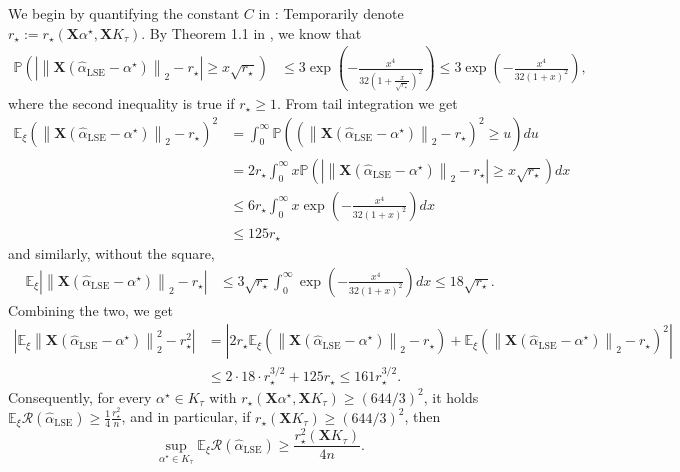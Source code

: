 \documentclass[a4paper]{article}
\newcommand{\pr}[1]{\left(#1\right)}
\newcommand{\abs}[1]{\left\lvert#1\right\rvert}
\newcommand{\norm}[1]{\left\|#1\right\|}
\newcommand{\X}[0]{\mathbf{X}}
\newcommand{\EE}[0]{\mathbb{E}}
\newcommand{\PP}[0]{\mathbb{P}}
\newcommand{\cR}[0]{\mathcal{R}}
\newcommand{\ha}[0]{\widehat{\alpha}}
\newcommand{\alphastar}{\alpha^\star}
\DeclareMathOperator{\LSEOp}{LSE}
\newcommand{\haLSE}[0]{\ha_{{\LSEOp}}}
\newcommand{\Kt}[0]{K_\tau}
\newcommand{\rstar}[0]{r_\star}
\theoremstyle{thmstyle}
\theoremstyle{defstyle}
\theoremstyle{remark}
\begin{document}
We begin by quantifying the constant $C$ in \cite[Corollary 1.2]{Chatterjee2014}: Temporarily denote $\rstar:=\rstar(\X\alphastar,\X \Kt)$.
By Theorem 1.1 in \cite{Chatterjee2014}, we know that
\begin{align*}
    \PP\pr{\abs{\norm{\X\pr{\haLSE-\alphastar}}_2-\rstar}\geq x\sqrt{\rstar}}&\leq 3\exp\pr{-\frac{x^4}{32(1+\frac{x}{\sqrt{\rstar}})^2}} \leq 3\exp\pr{-\frac{x^4}{32(1+x)^2}},
\end{align*}
where the second inequality is true if $\rstar\geq 1$.
From tail integration we get
\begin{align*}
    \EE_\xi\pr{\norm{\X(\haLSE-\alphastar)}_2-\rstar}^2 &= \int_0^\infty \PP\pr{\pr{\norm{\X(\haLSE-\alphastar)}_2-\rstar}^2\geq u}du \\
    &= 2\rstar \int_0^\infty x\PP\pr{\abs{\norm{\X\pr{\haLSE-\alphastar}}_2-\rstar}\geq x\sqrt{\rstar}}dx \\
    &\leq  6\rstar\int_0^\infty x \exp\pr{-\frac{x^4}{32(1+x)^2}}dx \\
    &\leq  125 \rstar
\end{align*}
and similarly, without the square,
\begin{align*}
    \EE_\xi\abs{\norm{\X(\haLSE-\alphastar)}_2-\rstar}
    &\leq  3\sqrt{\rstar}\int_0^\infty \exp\pr{-\frac{x^4}{32(1+x)^2}}dx \leq  18 \sqrt{\rstar}.
\end{align*}
Combining the two, we get
\begin{align*}
    \abs{\EE_\xi \norm{\X(\haLSE-\alphastar)}_2^2-\rstar^2}&= \abs{2\rstar \EE_\xi(\norm{\X(\haLSE-\alphastar)}_2-\rstar)+\EE_\xi(\norm{\X(\haLSE-\alphastar)}_2-\rstar)^2} \\
    &\leq 2\cdot 18\cdot \rstar^{3/2}+125\rstar \leq 161\rstar^{3/2}.
\end{align*}
Consequently, for every $\alphastar\in \Kt$ with $\rstar(\X\alphastar,\X\Kt)\geq (644/3)^2$, it holds $ \EE_\xi\cR(\haLSE)\geq \frac{1}{4}\frac{\rstar^2}{n}$, and in particular, if $\rstar(\X\Kt)\geq (644/3)^2$, then
\begin{equation}
    \label{eq:tight-bound-LSE}
     \sup_{\alphastar\in \Kt} \EE_\xi\cR(\haLSE) \geq \frac{\rstar^2(\X\Kt)}{4n}.
\end{equation}
\end{document}
